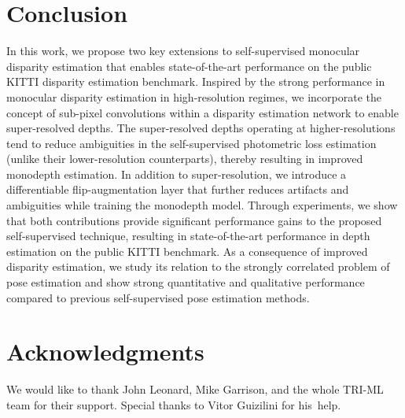 \documentclass[letterpaper, 10 pt, conference]{ieeeconf}  \IEEEoverridecommandlockouts
\begin{document}
  

\section{Conclusion} 
In this work, we propose two key extensions to self-supervised monocular disparity estimation that enables state-of-the-art performance on the public KITTI disparity estimation benchmark. Inspired by the strong performance in monocular disparity estimation in high-resolution regimes, we incorporate the concept of sub-pixel convolutions within a disparity estimation network to enable super-resolved depths. The super-resolved depths operating at higher-resolutions tend to reduce ambiguities in the self-supervised photometric loss estimation (unlike their lower-resolution counterparts), thereby resulting in improved monodepth estimation. In addition to super-resolution, we introduce a differentiable flip-augmentation layer that further reduces artifacts and ambiguities while training the monodepth model. Through experiments, we show that both contributions provide significant performance gains to the proposed self-supervised technique, resulting in state-of-the-art performance in depth estimation on the public KITTI benchmark. As a consequence of improved disparity estimation, we study its relation to the strongly correlated problem of pose estimation and show strong quantitative and qualitative performance compared to previous self-supervised pose estimation methods. 
 \section*{Acknowledgments}
We would like to thank John Leonard, Mike Garrison, and the whole TRI-ML team for their support. Special thanks to Vitor Guizilini for his~help.
\balance


\end{document}
